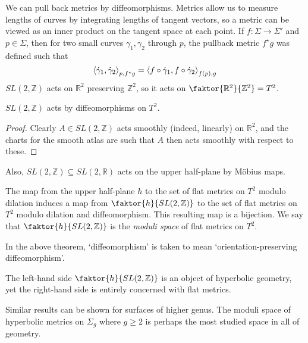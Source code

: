 We can pull back metrics by diffeomorphisms.
Metrics allow us to measure lengths of curves by integrating lengths of tangent vectors, so a metric can be viewed as an inner product on the tangent space at each point.
If \( f \colon \Sigma \to \Sigma' \) and \( p \in \Sigma \), then for two small curves \( \gamma_1, \gamma_2 \) through \( p \), the pullback metric \( f^\star g \) was defined such that
\[ \left\langle{\dot \gamma_1, \dot \gamma_2}\right\rangle_{p, f^\star g} = \left\langle{f \circ \dot \gamma_1, f \circ \dot \gamma_2}\right\rangle_{f(p), g} \]
\( SL(2,\mathbb Z) \) acts on \( \mathbb R^2 \) preserving \( \mathbb Z^2 \), so it acts on \( \faktor{\mathbb R^2}{\mathbb Z^2} = T^2 \).
\begin{lemma}
	\( SL(2,\mathbb Z) \) acts by diffeomorphisms on \( T^2 \).
\end{lemma}
\begin{proof}
	Clearly \( A \in SL(2,\mathbb Z) \) acts smoothly (indeed, linearly) on \( \mathbb R^2 \), and the charts for the smooth atlas are such that \( A \) then acts smoothly with respect to these.
\end{proof}
Also, \( SL(2,\mathbb Z) \subseteq SL(2,\mathbb R) \) acts on the upper half-plane by M\"obius maps.
\begin{theorem}
	The map from the upper half-plane \( h \) to the set of flat metrics on \( T^2 \) modulo dilation induces a map from \( \faktor{h}{SL(2,\mathbb Z)} \) to the set of flat metrics on \( T^2 \) modulo dilation and diffeomorphism.
	This resulting map is a bijection.
	We say that \( \faktor{h}{SL(2,\mathbb Z)} \) is the \textit{moduli space} of flat metrics on \( T^2 \).
\end{theorem}
In the above theorem, `diffeomorphism' is taken to mean `orientation-preserving diffeomorphism'.
\begin{remark}
	The left-hand side \( \faktor{h}{SL(2,\mathbb Z)} \) is an object of hyperbolic geometry, yet the right-hand side is entirely concerned with flat metrics.

	Similar results can be shown for surfaces of higher genus.
	The moduli space of hyperbolic metrics on \( \Sigma_g \) where \( g \geq 2 \) is perhaps the most studied space in all of geometry.
\end{remark}

